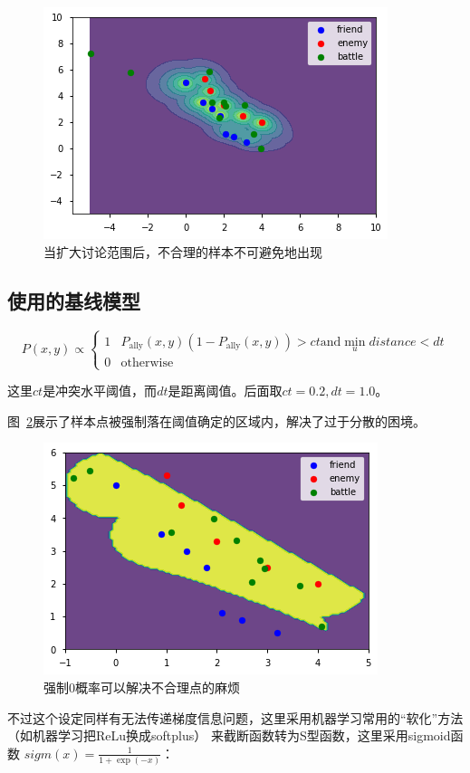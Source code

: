 \documentclass{sicnuthesis}
\begin{document}
\begin{figure}[htb]
\includegraphics[width=0.6\linewidth]{comb4.png}
\caption{
当扩大讨论范围后，不合理的样本不可避免地出现}
\label{fig:combThree}
\end{figure}

\subsection{使用的基线模型}

$$
P(x,y) \propto
\begin{cases}
1 & P_\text{ally}(x,y) (1-P_\text{ally}(x,y)) > ct \text{and} \min_{u} distance < dt \\
0 & \text{otherwise}
\end{cases}
$$

这里$ct$是冲突水平阈值，而$dt$是距离阈值。后面取$ct=0.2,dt=1.0$。

图~\ref{fig:combFive}展示了样本点被强制落在阈值确定的区域内，解决了过于分散的困境。

\begin{figure}[htb]
\includegraphics[width=0.6\linewidth]{comb5.png}
\caption{
强制0概率可以解决不合理点的麻烦}
\label{fig:combFive}
\end{figure}


不过这个设定同样有无法传递梯度信息问题，这里采用机器学习常用的“软化”方法（如机器学习把ReLu换成softplus）
来截断函数转为S型函数，这里采用sigmoid函数 $sigm(x) = \frac{1}{1+\exp(-x)}$：
\end{document}
